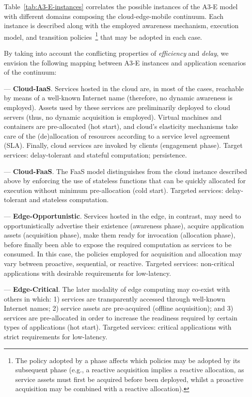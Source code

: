Table~\ref{tab:A3-E-instances} correlates the possible instances of the A3-E model with different domains composing the cloud-edge-mobile continuum. Each instance is described  along with the employed awareness mechanism, execution model, and transition policies~\footnote{The policy adopted by a phase affects which policies may be adopted by its subsequent phase (e.g., a reactive acquisition implies a reactive allocation, as service assets must first be acquired before been deployed, whilst a proactive acquisition may be combined with a reactive allocation).} that may be adopted in each case. 

By taking into account the conflicting properties of \textit{efficiency} and \textit{delay}, we envision the following mapping between A3-E instances and application scenarios of the continuum:

--- \textbf{Cloud-IaaS}. Services hosted in the cloud are, in most of the cases, reachable by means of a well-known Internet name (therefore, no dynamic awareness is employed). Assets used by these services are preliminarily deployed to cloud servers (thus, no dynamic acquisition is employed). Virtual machines and containers are pre-allocated (hot start), and cloud's elasticity mechanisms take care of the (de)allocation of resources according to a service level agreement (SLA). Finally, cloud services are invoked by clients (engagement phase). Target services: delay-tolerant and stateful computation; persistence.

--- \textbf{Cloud-FaaS}. The FaaS model distinguishes from the cloud instance described above by enforcing the use of stateless functions that can be quickly allocated for execution without minimum pre-allocation (cold start). Targeted services: delay-tolerant and stateless computation.

--- \textbf{Edge-Opportunistic}. Services hosted in the edge, in contrast, may need to opportunistically advertise their existence (awareness phase), acquire application assets (acquisition phase), make them ready for invocation (allocation phase), before finally been able to expose the required computation as services to be consumed. In this case, the policies employed for acquisition and allocation may vary between proactive, sequential, or reactive. Targeted services: non-critical applications with desirable requirements for low-latency.

--- \textbf{Edge-Critical}. The later modality of edge computing may co-exist with others in which: 1) services are transparently accessed through well-known Internet names; 2) service assets are pre-acquired (offline acquisition); and 3) services are pre-allocated in order to increase the readiness required by certain types of applications (hot start). Targeted services: critical applications with strict requirements for low-latency.

